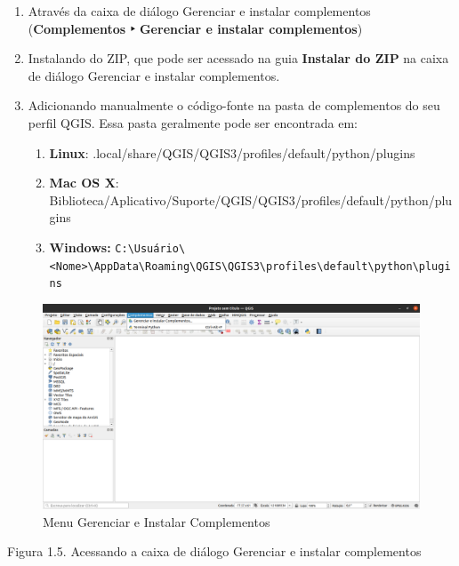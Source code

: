\documentclass[
]{book}
\providecommand{\tightlist}{%
  \setlength{\itemsep}{0pt}\setlength{\parskip}{0pt}}
\begin{document}
\begin{enumerate}
\def\labelenumi{\arabic{enumi}.}
\tightlist
\item
  Através da caixa de diálogo Gerenciar e instalar complementos (\textbf{Complementos ‣ Gerenciar e instalar complementos})
\item
  Instalando do ZIP, que pode ser acessado na guia \textbf{Instalar do ZIP} na caixa de diálogo Gerenciar e instalar complementos.
\item
  Adicionando manualmente o código-fonte na pasta de complementos do seu perfil QGIS. Essa pasta geralmente pode ser encontrada em:

  \begin{enumerate}
  \def\labelenumii{\arabic{enumii}.}
  \tightlist
  \item
    \textbf{Linux}: .local/share/QGIS/QGIS3/profiles/default/python/plugins
  \item
    \textbf{Mac OS X}: Biblioteca/Aplicativo/Suporte/QGIS/QGIS3/profiles/default/python/plugins
  \item
    \textbf{Windows:} \texttt{C:\textbackslash{}Usuário\textbackslash{}\textless{}Nome\textgreater{}\textbackslash{}AppData\textbackslash{}Roaming\textbackslash{}QGIS\textbackslash{}QGIS3\textbackslash{}profiles\textbackslash{}default\textbackslash{}python\textbackslash{}plugins}
  \end{enumerate}
\end{enumerate}

\begin{figure}
\centering
\includegraphics{media/modulo1/plugins-menu.png}
\caption{Menu Gerenciar e Instalar Complementos}
\end{figure}

Figura 1.5. Acessando a caixa de diálogo Gerenciar e instalar complementos
\end{document}
